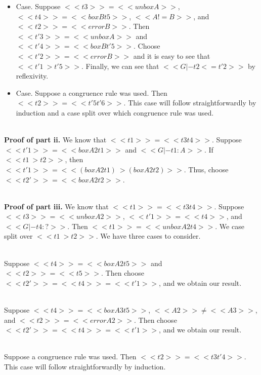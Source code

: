 \begin{description}
\begin{itemize}
  \item[] Case.  Suppose $<<t3>> = <<unbox A>>$, $<<t4>> = <<box B t5>>$, $<<A != B>>$,
    and $<<t2>> = <<error B>>$.  Then $<<t'3>> = <<unbox A>>$ and $<<t'4>> = <<box B t'5>>$.
    Choose $<<t'2>> = <<error B>>$ and it is easy to see that $<<t'1 ~> t'5>>$.  Finally,
    we can see that $<<G |- t2 <= t'2>>$ by reflexivity.
    
  \item[] Case. Suppose a congruence rule was used.  Then $<<t2>> = <<t'5 t'6>>$.
    This case will follow straightforwardly by induction and a case split over which congruence rule was used.
  \end{itemize}

  \ \\
  \noindent
  \textbf{Proof of part ii.} We know that $<<t1>> = <<t3 t4>>$.  Suppose $<<t'1>> = <<box A2 t1>>$ and $<<G |- t1 : A>>$.
  If $<<t1 ~> t2>>$, then $<<t'1>> = <<(box A2 t1) ~> (box A2 t2)>>$.  Thus, choose $<<t2'>> = <<box A2 t2>>$.

  \ \\
  \noindent
  \textbf{Proof of part iii.} We know that $<<t1>> = <<t3 t4>>$. Suppose
  $<<t3>> = <<unbox A2>>$, $<<t'1>> = <<t4>>$, and $<<G |- t4 : ?>>$.  Then $<<t1>> = <<unbox A2 t4>>$.  We
  case split over $<<t1 ~> t2>>$.  We have three cases to consider.

  \ \\
  \noindent
  Suppose $<<t4>> = <<box A2 t5>>$ and $<<t2>> = <<t5>>$.  Then choose $<<t2'>> = <<t4>> = <<t'1>>$, and we
  obtain our result.

  \ \\
  \noindent
  Suppose $<<t4>> = <<box A3 t5>>$, $<<A2>> \neq <<A3>>$, and $<<t2>> = <<error A2>>$. Then choose $<<t2'>> = <<t4>> = <<t'1>>$,
  and we obtain our result.

  \ \\
  \noindent
  Suppose a congruence rule was used.  Then $<<t2>> = <<t3 t'4>>$. This case will follow straightforwardly by induction.
\end{description}



